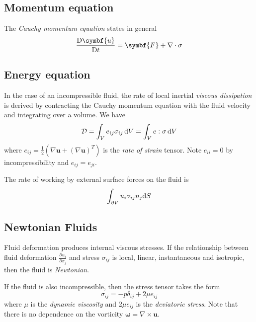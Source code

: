 \documentclass{jknotes}
\begin{document}
\subsection{Momentum equation}
The \emph{Cauchy momentum equation} states in general
\begin{equation}
	\frac{\diffD{\symbf{u}}}{\diffD{t}} = \symbf{F} + \nabla \cdot \sigma
\end{equation}

\subsection{Energy equation}
In the case of an incompressible fluid, the rate of local inertial
\emph{viscous dissipation} is derived by contracting the Cauchy momentum
equation with the fluid velocity and integrating over a volume. We have
\begin{equation}
	\mathcal{D} = \int_V e_{ij} \sigma_{ij} \,\diffd{V} = \int_V e:\sigma \,
	\diffd{V}
\end{equation}
where $e_{ij} = \frac{1}{2}\left(\nabla \symbf{u} + \left(\nabla
\symbf{u}\right)^T\right)$ is the \emph{rate of strain} tensor. Note $e_{ii} = 0$
by incompressibility and $e_{ij} = e_{ji}$. 

The rate of working by external surface forces on the fluid is
\begin{equation}
	\int_{\partial V} u_i \sigma_{ij} n_j \diffd{S}
\end{equation}

\subsection{Newtonian Fluids}
\begin{defn}
Fluid deformation produces internal viscous stresses. If the relationship
between fluid deformation $\frac{\partial u_i}{\partial x_j}$ and stress
$\sigma_{ij}$ is local, linear, instantaneous and isotropic, then the fluid is
\emph{Newtonian}.
\end{defn}

If the fluid is also incompressible, then the stress tensor takes the form
\begin{equation}
	\sigma_{ij} = -p \delta_{ij} + 2\mu e_{ij}
\end{equation}
where $\mu$ is the \emph{dynamic viscosity} and $2 \mu e_{ij}$ is the
\emph{deviatoric stress}. Note that there is no dependence on the vorticity
$\symbf{\omega} = \nabla \times \symbf{u}$.
\end{document}
